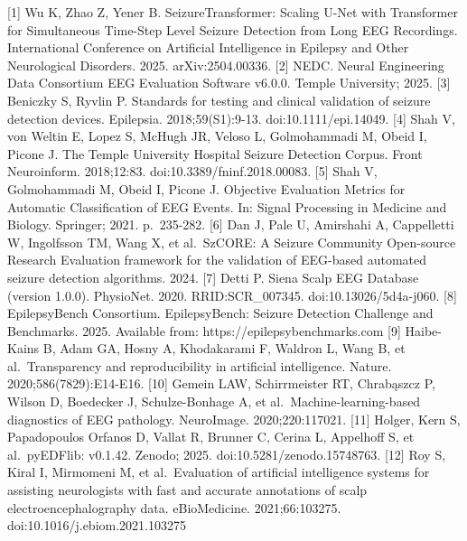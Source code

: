 {[}1{]} Wu K, Zhao Z, Yener B. SeizureTransformer: Scaling U-Net with
Transformer for Simultaneous Time-Step Level Seizure Detection from Long
EEG Recordings. International Conference on Artificial Intelligence in
Epilepsy and Other Neurological Disorders. 2025. arXiv:2504.00336.
{[}2{]} NEDC. Neural Engineering Data Consortium EEG Evaluation Software
v6.0.0. Temple University; 2025. {[}3{]} Beniczky S, Ryvlin P. Standards
for testing and clinical validation of seizure detection devices.
Epilepsia. 2018;59(S1):9-13. doi:10.1111/epi.14049. {[}4{]} Shah V, von
Weltin E, Lopez S, McHugh JR, Veloso L, Golmohammadi M, Obeid I, Picone
J. The Temple University Hospital Seizure Detection Corpus. Front
Neuroinform. 2018;12:83. doi:10.3389/fninf.2018.00083. {[}5{]} Shah V,
Golmohammadi M, Obeid I, Picone J. Objective Evaluation Metrics for
Automatic Classification of EEG Events. In: Signal Processing in
Medicine and Biology. Springer; 2021. p.~235-282. {[}6{]} Dan J, Pale U,
Amirshahi A, Cappelletti W, Ingolfsson TM, Wang X, et al.~SzCORE: A
Seizure Community Open-source Research Evaluation framework for the
validation of EEG-based automated seizure detection algorithms. 2024.
{[}7{]} Detti P. Siena Scalp EEG Database (version 1.0.0). PhysioNet.
2020. RRID:SCR\_007345. doi:10.13026/5d4a-j060. {[}8{]} EpilepsyBench
Consortium. EpilepsyBench: Seizure Detection Challenge and Benchmarks.
2025. Available from: https://epilepsybenchmarks.com {[}9{]} Haibe-Kains
B, Adam GA, Hosny A, Khodakarami F, Waldron L, Wang B, et
al.~Transparency and reproducibility in artificial intelligence. Nature.
2020;586(7829):E14-E16. {[}10{]} Gemein LAW, Schirrmeister RT,
Chrabąszcz P, Wilson D, Boedecker J, Schulze-Bonhage A, et
al.~Machine-learning-based diagnostics of EEG pathology. NeuroImage.
2020;220:117021. {[}11{]} Holger, Kern S, Papadopoulos Orfanos D, Vallat
R, Brunner C, Cerina L, Appelhoff S, et al.~pyEDFlib: v0.1.42. Zenodo;
2025. doi:10.5281/zenodo.15748763. {[}12{]} Roy S, Kiral I, Mirmomeni M,
et al.~Evaluation of artificial intelligence systems for assisting
neurologists with fast and accurate annotations of scalp
electroencephalography data. eBioMedicine. 2021;66:103275.
doi:10.1016/j.ebiom.2021.103275

